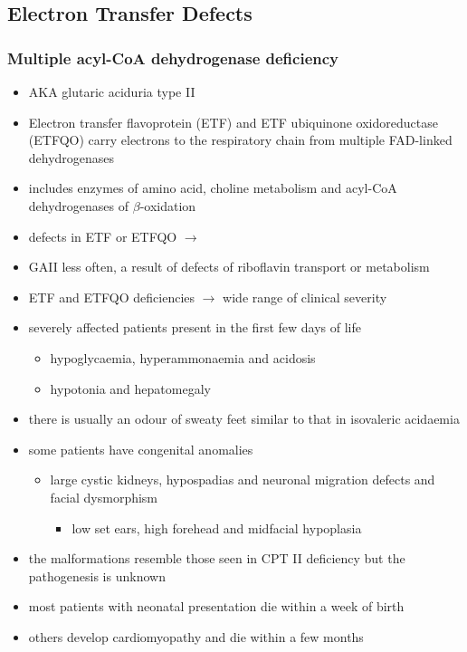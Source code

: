 \documentclass{scrartcl}
\begin{document}
\subsection{Electron Transfer Defects}
\label{sec:orge1bbf21}
\subsubsection{Multiple acyl-CoA dehydrogenase deficiency}
\label{sec:org149b1c7}
\begin{itemize}
\item AKA glutaric aciduria type II
\item Electron transfer flavoprotein (ETF) and ETF ubiquinone
oxidoreductase (ETFQO) carry electrons to the respiratory chain from
multiple FAD-linked dehydrogenases
\item includes enzymes of amino acid, choline metabolism and acyl-CoA
dehydrogenases of \(\beta\)-oxidation
\item defects in ETF or ETFQO \(\to\)
\item GAII less often, a result of defects of riboflavin transport or
metabolism
\item ETF and ETFQO deficiencies \(\to\) wide range of clinical severity
\item severely affected patients present in the first few days of life
\begin{itemize}
\item hypoglycaemia, hyperammonaemia and acidosis
\item hypotonia and hepatomegaly
\end{itemize}
\item there is usually an odour of sweaty feet similar to that in isovaleric acidaemia
\item some patients have congenital anomalies
\begin{itemize}
\item large cystic kidneys, hypospadias and neuronal migration defects and facial dysmorphism
\begin{itemize}
\item low set ears, high forehead and midfacial hypoplasia
\end{itemize}
\end{itemize}
\item the malformations resemble those seen in CPT II deficiency but the pathogenesis is unknown
\item most patients with neonatal presentation die within a week of birth
\item others develop cardiomyopathy and die within a few months

\end{itemize}
\end{document}
